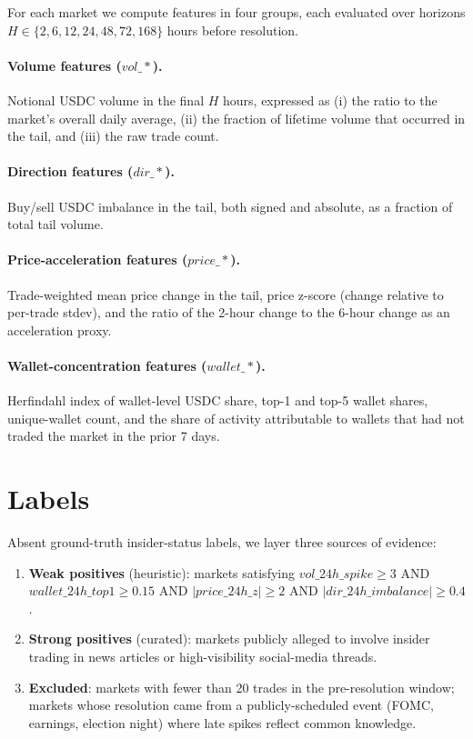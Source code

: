 \documentclass[11pt]{article}
\begin{document}
For each market we compute features in four groups, each evaluated over
horizons $H \in \{2, 6, 12, 24, 48, 72, 168\}$ hours before resolution.

\paragraph{Volume features ($vol\_*$).}
Notional USDC volume in the final $H$ hours, expressed as (i) the ratio
to the market's overall daily average, (ii) the fraction of lifetime
volume that occurred in the tail, and (iii) the raw trade count.

\paragraph{Direction features ($dir\_*$).}
Buy/sell USDC imbalance in the tail, both signed and absolute, as a
fraction of total tail volume.

\paragraph{Price-acceleration features ($price\_*$).}
Trade-weighted mean price change in the tail, price z-score (change
relative to per-trade stdev), and the ratio of the 2-hour change to the
6-hour change as an acceleration proxy.

\paragraph{Wallet-concentration features ($wallet\_*$).}
Herfindahl index of wallet-level USDC share, top-1 and top-5 wallet
shares, unique-wallet count, and the share of activity attributable to
wallets that had not traded the market in the prior 7 days.

\section{Labels}
\label{sec:labels}

Absent ground-truth insider-status labels, we layer three sources of
evidence:

\begin{enumerate}
  \item \textbf{Weak positives} (heuristic): markets satisfying
    $vol\_24h\_spike \geq 3$ AND
    $wallet\_24h\_top1 \geq 0.15$ AND
    $\lvert price\_24h\_z \rvert \geq 2$ AND
    $\lvert dir\_24h\_imbalance \rvert \geq 0.4$.
  \item \textbf{Strong positives} (curated): markets publicly alleged
    to involve insider trading in news articles or high-visibility
    social-media threads.
  \item \textbf{Excluded}: markets with fewer than 20 trades in the
    pre-resolution window; markets whose resolution came from a
    publicly-scheduled event (FOMC, earnings, election night) where
    late spikes reflect common knowledge.
\end{enumerate}
\end{document}
